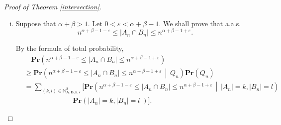\documentclass{article}
\newcommand{\vide}{\textup{\O}}
\newcommand{\bs}{\boldsymbol}
\newcommand{\tendvers}{\xrightarrow[n\to\infty]{}}
\def\Pr{\mathbf{Pr}}
\newcommand\esp[1]{\mathbb{E}\left( #1 \right)}
\theoremstyle{remark}
\begin{document}
\begin{proof}[Proof of Theorem \ref{intersection}]
\begin{enumerate}[(i)]
        For any $(k,l)\in \mathbb{N}^2_{\bs A,\bs B, n, \varepsilon}$, by Lemma \ref{concentration uniform} (i)
        \[\begin{split}
        \esp{|A_n \cap B_n|\,\middle|\,|A_n|=k,|B_n| = l}
        & = \esp{|A_n \cap B_n|\,\middle|\,|A_n|=n^{\alpha'},|B_n| = n^{\beta'}}\\
        & \leq n^{\alpha'+\beta'-1} \leq n^{\alpha+\beta+2/3\varepsilon-1}\leq n^{-1/3\varepsilon}. 
        \end{split}\]
        Hence
        \[\Pr(A_n\cap B_n\neq\vide) \leq n^{-1/3\varepsilon}\Pr(Q_n)+\Pr(\overline{Q_n})\tendvers 0.\]
        
        \item Suppose that $\alpha+\beta>1$. Let $0<\varepsilon<\alpha+\beta-1$. We shall prove that a.a.s.
        \[n^{\alpha+\beta-1-\varepsilon}\leq|A_n\cap B_n|\leq n^{\alpha+\beta-1+\varepsilon}.\]

        By the formula of total probability,
        \[ \begin{split}&\quad \Pr(n^{\alpha+\beta-1-\varepsilon} \leq |A_n\cap B_n| \leq n^{\alpha+\beta-1+\varepsilon})\\
        & \geq \Pr\left(n^{\alpha+\beta-1-\varepsilon}\leq |A_n\cap B_n| \leq n^{\alpha+\beta-1+\varepsilon}\,\middle|\,Q_n\right)\Pr(Q_n)\\
        & = \sum_{(k,l)\in\mathbb{N}^2_{\bs A,\bs B, n, \varepsilon}} \Big[ \Pr\left(n^{\alpha+\beta-1-\varepsilon}\leq |A_n\cap B_n| \leq n^{\alpha+\beta-1+\varepsilon}\,\middle|\,|A_n|=k,|B_n| = l\right)\\
        &\qquad\qquad\qquad\quad\Pr(|A_n|=k,|B_n| = l|)\Big].
        \end{split}\]
        

\end{enumerate}
\end{proof}
\end{document}

